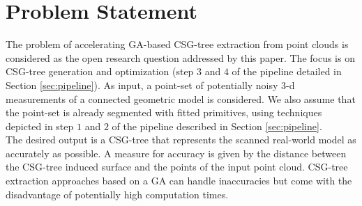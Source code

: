 \section{Problem Statement}
\label{sec:prob}
The problem of accelerating \ac{GA}-based \ac{CSG}-tree extraction from point clouds is considered as the open research question addressed by this paper.
The focus is on \ac{CSG}-tree generation and optimization (step $3$ and $4$ of the pipeline detailed in Section \ref{sec:pipeline}).
As input, a point-set of potentially noisy $3$-d measurements of a connected geometric model is considered. We also assume that the point-set is already segmented with fitted primitives, using techniques depicted in step $1$ and $2$ of the pipeline described in Section \ref{sec:pipeline}.
\\
The desired output is a \ac{CSG}-tree that represents the scanned real-world model as accurately as possible.
A measure for accuracy is given by the distance between the \ac{CSG}-tree induced surface and the points of the input point cloud.
\ac{CSG}-tree extraction approaches based on a \ac{GA} \cite{fayolle2016evolutionary} can handle 
inaccuracies but come with the disadvantage of potentially high computation times.
